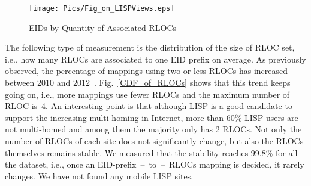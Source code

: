 \begin{figure}[ht]
        \centering
        \texttt{[image: Pics/Fig\_on\_LISPViews.eps]}
        \caption{EIDs by Quantity of Associated RLOCs~\cite{lispviews}}
        \label{Fig_on_LISPViews}
\end{figure}

The following type of measurement is the distribution of the size of RLOC set,
i.e., how many RLOCs are associated to one EID prefix on average. As
previously observed, the percentage of mappings using two or less RLOCs has
increased between 2010 and $2012$~\cite{lispCCR}. Fig.~\ref{CDF_of_RLOCs}
shows that this trend keeps going on, i.e., more mappings use fewer RLOCs and
the maximum number of RLOC is~4. An interesting point is that although LISP is a
good candidate to support the increasing multi-homing in Internet,
more than 60\% LISP users are not multi-homed and among them the majority
only has 2 RLOCs. Not only the number of RLOCs of each site does not significantly
change, but also the RLOCs themselves remains stable. We measured that the
stability reaches 99.8\% for all the dataset, i.e., once an
EID-prefix~--~to~--~RLOCs mapping is decided, it rarely changes. We have not found any mobile LISP sites.


